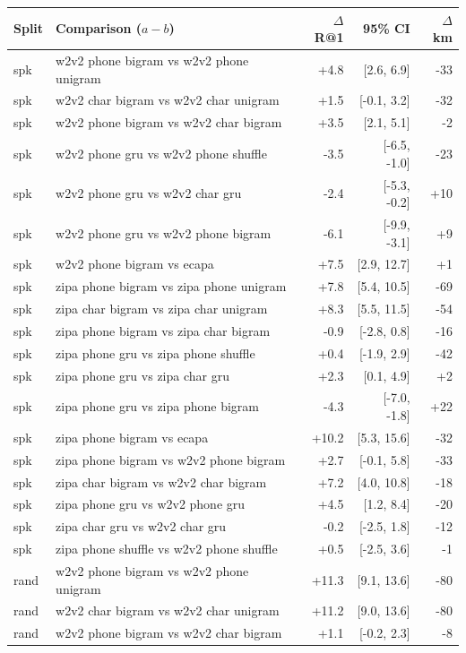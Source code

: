 \begin{tabular}{llrrr}
\toprule
Split & Comparison ($a - b$) & $\Delta$R@1 & 95\% CI & $\Delta$km \\
\midrule
spk & w2v2 phone bigram vs w2v2 phone unigram & +4.8 & [2.6, 6.9] & -33 \\
spk & w2v2 char bigram vs w2v2 char unigram & +1.5 & [-0.1, 3.2] & -32 \\
spk & w2v2 phone bigram vs w2v2 char bigram & +3.5 & [2.1, 5.1] & -2 \\
spk & w2v2 phone gru vs w2v2 phone shuffle & -3.5 & [-6.5, -1.0] & -23 \\
spk & w2v2 phone gru vs w2v2 char gru & -2.4 & [-5.3, -0.2] & +10 \\
spk & w2v2 phone gru vs w2v2 phone bigram & -6.1 & [-9.9, -3.1] & +9 \\
spk & w2v2 phone bigram vs ecapa & +7.5 & [2.9, 12.7] & +1 \\
spk & zipa phone bigram vs zipa phone unigram & +7.8 & [5.4, 10.5] & -69 \\
spk & zipa char bigram vs zipa char unigram & +8.3 & [5.5, 11.5] & -54 \\
spk & zipa phone bigram vs zipa char bigram & -0.9 & [-2.8, 0.8] & -16 \\
spk & zipa phone gru vs zipa phone shuffle & +0.4 & [-1.9, 2.9] & -42 \\
spk & zipa phone gru vs zipa char gru & +2.3 & [0.1, 4.9] & +2 \\
spk & zipa phone gru vs zipa phone bigram & -4.3 & [-7.0, -1.8] & +22 \\
spk & zipa phone bigram vs ecapa & +10.2 & [5.3, 15.6] & -32 \\
spk & zipa phone bigram vs w2v2 phone bigram & +2.7 & [-0.1, 5.8] & -33 \\
spk & zipa char bigram vs w2v2 char bigram & +7.2 & [4.0, 10.8] & -18 \\
spk & zipa phone gru vs w2v2 phone gru & +4.5 & [1.2, 8.4] & -20 \\
spk & zipa char gru vs w2v2 char gru & -0.2 & [-2.5, 1.8] & -12 \\
spk & zipa phone shuffle vs w2v2 phone shuffle & +0.5 & [-2.5, 3.6] & -1 \\
rand & w2v2 phone bigram vs w2v2 phone unigram & +11.3 & [9.1, 13.6] & -80 \\
rand & w2v2 char bigram vs w2v2 char unigram & +11.2 & [9.0, 13.6] & -80 \\
rand & w2v2 phone bigram vs w2v2 char bigram & +1.1 & [-0.2, 2.3] & -8 \\

\end{tabular}
